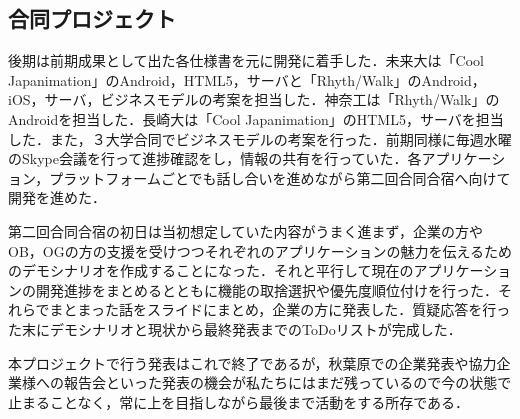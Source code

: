 \subsection{合同プロジェクト}
\par 後期は前期成果として出た各仕様書を元に開発に着手した．未来大は「Cool Japanimation」のAndroid，HTML5，サーバと「Rhyth/Walk」のAndroid，iOS，サーバ，ビジネスモデルの考案を担当した．神奈工は「Rhyth/Walk」のAndroidを担当した．長崎大は「Cool Japanimation」のHTML5，サーバを担当した．また，３大学合同でビジネスモデルの考案を行った．前期同様に毎週水曜のSkype会議を行って進捗確認をし，情報の共有を行っていた．各アプリケーション，プラットフォームごとでも話し合いを進めながら第二回合同合宿へ向けて開発を進めた．
\par 第二回合同合宿の初日は当初想定していた内容がうまく進まず，企業の方やOB，OGの方の支援を受けつつそれぞれのアプリケーションの魅力を伝えるためのデモシナリオを作成することになった．それと平行して現在のアプリケーションの開発進捗をまとめるとともに機能の取捨選択や優先度順位付けを行った．それらでまとまった話をスライドにまとめ，企業の方に発表した．質疑応答を行った末にデモシナリオと現状から最終発表までのToDoリストが完成した．
\par 本プロジェクトで行う発表はこれで終了であるが，秋葉原での企業発表や協力企業様への報告会といった発表の機会が私たちにはまだ残っているので今の状態で止まることなく，常に上を目指しながら最後まで活動をする所存である．
